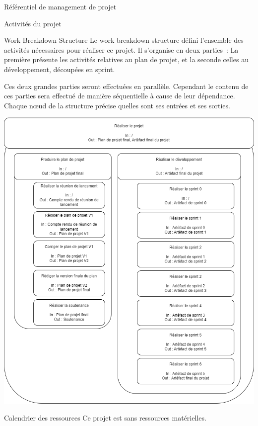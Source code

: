 \documentclass[]{article}
\begin{document}
{\begin{section}{\label{sec:Référentiel de management de projet}Référentiel de management de projet}
     \newpage

     \begin{subsection}{\label{sec:Activités du projet}Activités du projet}
         \begin{subsubsection}{\label{sec:Work Breakdown Structure}Work Breakdown Structure}
             Le work breakdown structure défini l’ensemble des activités nécessaires pour réaliser ce projet. Il s’organise en deux parties : La première présente les activités relatives au plan de projet, et la seconde celles au développement, découpées en sprint.

             Ces deux grandes parties seront effectuées en parallèle. Cependant le contenu de ces parties sera effectué de manière séquentielle à cause de leur dépendance. Chaque nœud de la structure précise quelles sont ses entrées et ses sorties.

             \includegraphics[scale=0.45]{documents/IMG/WBS}
         \end{subsubsection}

         \newpage

         \begin{subsubsection}{\label{sec:Calendrier des ressources}Calendrier des ressources}
             Ce projet est sans ressources matérielles.


\end{subsubsection}
\end{subsection}
\end{section}}
\end{document}
